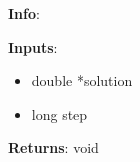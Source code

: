 \textbf{Info}:

\noindent \textbf{Inputs}:
\begin{itemize}
\item{double *solution}
\item{long step}
\end{itemize}

\noindent \textbf{Returns}: void
